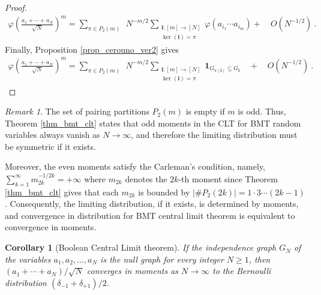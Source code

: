 \documentclass[a4paper,12pt]{extarticle}
\newtheorem{cor}[thm]{Corollary}
\theoremstyle{definition}
\theoremstyle{remark}
\newtheorem{rem}[thm]{Remark}
\begin{document}
\begin{proof}
  	\begin{align*}
		\varphi \left(\frac{a_1 + \cdots + a_N}{\sqrt{N}}\right)^m
		=
		\sum_{\pi \in P_2(m)}  \ \ 
		N^{-m/2}
		\sum_{\substack{ {\bm i}:[m]\rightarrow [N] \\ \ker({\bm i})=\pi}}  
			\varphi(a_{i_1}\cdots a_{i_m})	+ \quad O(N^{-1/2}) \ .  
	\end{align*}
Finally, Proposition  \ref{prop_cerouno_ver2} gives 
	\begin{align*}
		\varphi \left(\frac{a_1 + \cdots + a_N}{\sqrt{N}}\right)^m
		=
		\sum_{\pi \in P_2(m)}  \ \ 
		N^{-m/2}
		\sum_{\substack{ {\bm i}:[m]\rightarrow [N] \\ \ker({\bm i})=\pi}}  
		\bm{1}_{G_{\pi(\bm{i})}  \subseteq G_{\bm i}}  
		\quad	+ \quad O(N^{-1/2}) \ .  
	\end{align*}
\end{proof}

\begin{rem} \label{oddmoments}
%
The set of pairing partitions $P_2(m)$ is empty if $m$ is odd. 
%
Thus, Theorem \ref{thm_bmt_clt} states that odd moments in the CLT for BMT random variables always vanish as $N\to \infty$, and therefore the limiting distribution must be symmetric if it exists. 
%
%
%

Moreover, the even moments satisfy the Carleman's condition, namely, 
%
$\sum^\infty_{k=1}m_{2k}^{-1/2k}=+\infty$
%
where $m_{2k}$ denotes the $2k$-th moment since Theorem \ref{thm_bmt_clt} gives that each $m_{2k}$ is bounded by $|\#P_2(2k)|=1\cdot 3\cdots 
(2k-1)$. 
%
Consequently, the limiting distribution, if it exists, is determined by moments, and convergence in distribution for BMT central limit theorem is equivalent to convergence in moments.
\end{rem}


\begin{cor}[Boolean Central Limit theorem]\label{cor_boolean_ctl}
	If the independence graph $G_N$ of the variables $a_1,a_2,\ldots,a_N$ is the null graph for every integer $N\geq 1$, then $(a_1 + \cdots + a_N)/\sqrt{N}$ converges in moments as $N \to \infty$ to the Bernoulli distribution $(\delta_{-1} + \delta_{+1})/2$.  
\end{cor}
\end{document}
